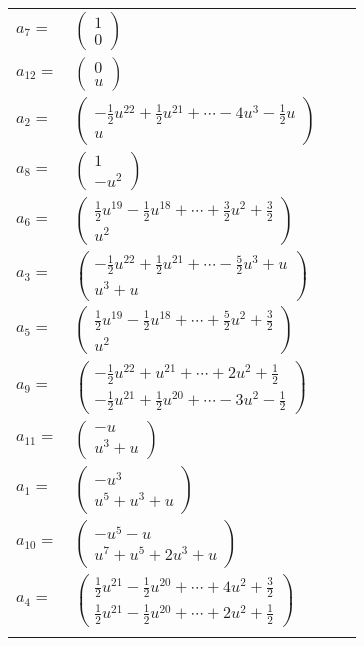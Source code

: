 \documentclass[1p]{elsarticle_modified}
\theoremstyle{definition}
\begin{document}
\begin{tabular}{m{7pt} m{180pt} m{7pt} m{180pt} }
\flushright $a_{7}=$&$\begin{pmatrix}1\\0\end{pmatrix}$ \\
\flushright $a_{12}=$&$\begin{pmatrix}0\\u\end{pmatrix}$ \\
\flushright $a_{2}=$&$\begin{pmatrix}-\frac{1}{2} u^{22}+\frac{1}{2} u^{21}+\cdots-4 u^3-\frac{1}{2} u\\u\end{pmatrix}$ \\
\flushright $a_{8}=$&$\begin{pmatrix}1\\- u^2\end{pmatrix}$ \\
\flushright $a_{6}=$&$\begin{pmatrix}\frac{1}{2} u^{19}-\frac{1}{2} u^{18}+\cdots+\frac{3}{2} u^2+\frac{3}{2}\\u^2\end{pmatrix}$ \\
\flushright $a_{3}=$&$\begin{pmatrix}-\frac{1}{2} u^{22}+\frac{1}{2} u^{21}+\cdots-\frac{5}{2} u^3+u\\u^3+u\end{pmatrix}$ \\
\flushright $a_{5}=$&$\begin{pmatrix}\frac{1}{2} u^{19}-\frac{1}{2} u^{18}+\cdots+\frac{5}{2} u^2+\frac{3}{2}\\u^2\end{pmatrix}$ \\
\flushright $a_{9}=$&$\begin{pmatrix}-\frac{1}{2} u^{22}+u^{21}+\cdots+2 u^2+\frac{1}{2}\\-\frac{1}{2} u^{21}+\frac{1}{2} u^{20}+\cdots-3 u^2-\frac{1}{2}\end{pmatrix}$ \\
\flushright $a_{11}=$&$\begin{pmatrix}- u\\u^3+u\end{pmatrix}$ \\
\flushright $a_{1}=$&$\begin{pmatrix}- u^3\\u^5+u^3+u\end{pmatrix}$ \\
\flushright $a_{10}=$&$\begin{pmatrix}- u^5- u\\u^7+u^5+2 u^3+u\end{pmatrix}$ \\
\flushright $a_{4}=$&$\begin{pmatrix}\frac{1}{2} u^{21}-\frac{1}{2} u^{20}+\cdots+4 u^2+\frac{3}{2}\\\frac{1}{2} u^{21}-\frac{1}{2} u^{20}+\cdots+2 u^2+\frac{1}{2}\end{pmatrix}$\\&\end{tabular}
\end{document}
